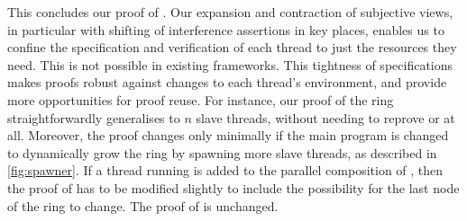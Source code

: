 This concludes our \colosl proof of . Our expansion and
contraction of subjective views, in particular with shifting of
interference assertions in key places, enables us to confine the
specification and verification of each thread to just the resources
they need. This is not possible in existing frameworks. This tightness
of specifications makes proofs robust against changes to each thread's
environment, and provide more opportunities for proof reuse. For
instance, our proof of the ring straightforwardly generalises to $n$
slave threads, without needing to reprove  or 
at all. Moreover, the proof changes only minimally if the main program
is changed to dynamically grow the ring by spawning more slave
threads, as described in \fig\ref{fig:spawner}. If a thread running
 is added to the parallel composition of , then
the proof of  has to be modified slightly to include the
possibility for the last node of the ring to change. The proof of
 is unchanged.

